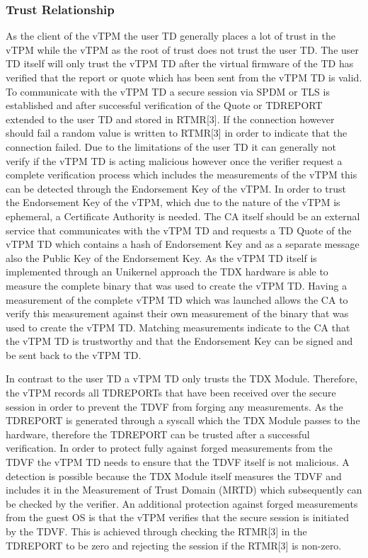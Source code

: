 \documentclass[sigplan,screen,nonacm]{acmart}
\begin{document}
\subsubsection{Trust Relationship}
\label{chap:trustrelationship}
As the client of the vTPM the user TD generally places a lot of trust in the vTPM while the vTPM as the root of trust does not trust the user TD\cite[p. 9]{Intel-vTPM}.
The user TD itself will only trust the vTPM TD after the virtual firmware of the TD has verified that the report or quote which has been sent from the vTPM TD is valid\cite[p. 9]{Intel-vTPM}.
To communicate with the vTPM TD a secure session via SPDM or TLS is established and after successful verification of the Quote or TDREPORT extended to the user TD and stored in RTMR[3].
If the connection however should fail a random value is written to RTMR[3] in order to indicate that the connection failed.
Due to the limitations of the user TD it can generally not verify if the vTPM TD is acting malicious however once the verifier request a complete verification process which includes the measurements of the vTPM this can be detected through the Endorsement Key of the vTPM.
In order to trust the Endorsement Key of the vTPM, which due to the nature of the vTPM is ephemeral, a Certificate Authority is needed.
The CA itself should be an external service that communicates with the vTPM TD and requests a TD Quote of the vTPM TD which contains a hash of Endorsement Key and as a separate message also the Public Key of the Endorsement Key.
As the vTPM TD itself is implemented through an Unikernel approach the TDX hardware is able to measure the complete binary that was used to create the vTPM TD.
Having a measurement of the complete vTPM TD which was launched allows the CA to verify this measurement against their own measurement of the binary that was used to create the vTPM TD.
Matching measurements indicate to the CA that the vTPM TD is trustworthy and that the Endorsement Key can be signed and be sent back to the vTPM TD.

In contrast to the user TD a vTPM TD only trusts the TDX Module.
Therefore, the vTPM records all TDREPORTs that have been received over the secure session in order to prevent the TDVF from forging any measurements.
As the TDREPORT is generated through a syscall which the TDX Module passes to the hardware, therefore the TDREPORT can be trusted after a successful verification.
In order to protect fully against forged measurements from the TDVF the vTPM TD needs to ensure that the TDVF itself is not malicious.
A detection is possible because the TDX Module itself measures the TDVF and includes it in the Measurement of Trust Domain (MRTD) which subsequently can be checked by the verifier.
An additional protection against forged measurements from the guest OS is that the vTPM verifies that the secure session is initiated by the TDVF.
This is achieved through checking the RTMR[3] in the TDREPORT to be zero and rejecting the session if the RTMR[3] is non-zero.
\end{document}
